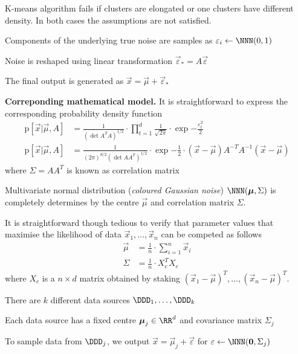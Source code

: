 \documentclass[landscape,footrule]{foils}
\newcommand{\pd}[1]{\mathrm{p}[#1]}
\begin{document}
K-means algorithm fails if clusters are elongated or one clusters have different density. In both cases the assumptions are not satisfied. 



\begin{triangles}
\item Components of the underlying true noise  are samples as $\varepsilon_i\gets\NNN(0,1)$
\item Noise is reshaped using linear transformation $\vec{\varepsilon}_*=A\vec{\varepsilon}$
\item The final output is generated as $\vec{x}=\vec{\mu}+\vec{\varepsilon}_*$ 
\end{triangles}
\vspace*{1cm}


\textbf{Correponding mathematical model.} It is straightforward to express the corresponding probability density function
\begin{align*}
\pd{\vec{x}|\vec{\mu},A}&=\frac{1}{(\det A^TA)^{1/2}}\cdot\prod_{t=1}^d\frac{1}{\sqrt{2\pi}}\cdot\exp{-\frac{\varepsilon_t^2}{2}}\\
\pd{\vec{x}|\vec{\mu},A}&=\frac{1}{(2\pi)^{d/2}(\det AA^T)^{1/2}}\cdot\exp{-\frac{1}{2}\cdot (\vec{x}-\vec{\mu})A^{-T}A^{-1}(\vec{x}-\vec{\mu})}
\end{align*} 
where $\Sigma=AA^T$ is known as correlation matrix



Multivariate normal distribution (\emph{coloured Gaussian noise}) $\NNN(\vec{\mu}, \Sigma)$ is completely determines by the centre $\vec{\mu}$ and correlation matrix $\Sigma$. 

It is straightforward though tedious to verify that parameter values that maximise the likelihood of data $\vec{x}_1,\ldots,\vec{x}_n$ can be competed as follows
\begin{align*}
\vec{\mu}&=\frac{1}{n}\cdot\sum_{i=1}^n \vec{x}_i\\
\Sigma&=\frac{1}{n}\cdot X_c^T X_c
\end{align*}
where $X_c$ is a $n\times d$ matrix obtained by staking $(\vec{x}_1-\vec{\mu})^T,\ldots,(\vec{x}_n-\vec{\mu})^T$.


\begin{triangles}
\item There are $k$ different data sources $\DDD_1,\ldots,\DDD_k$
\item Each data source has a fixed centre $\vec{\mu}_j\in\RR^d$ and covariance matrix $\Sigma_j$
\item To sample data from  $\DDD_j$, we output $\vec{x}=\vec{\mu}_j+\vec{\varepsilon}$ for $\varepsilon\gets\NNN(\vec{0},\Sigma_j)$ 
\end{triangles}
\end{document}
